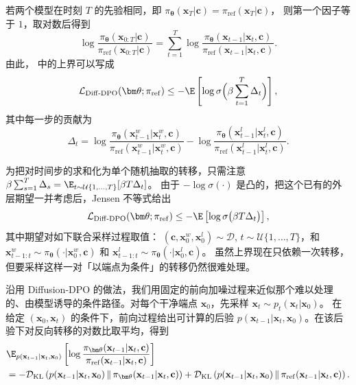 若两个模型在时刻 $T$ 的先验相同，即
$\pi_{\bm\theta}(\mathbf x_T| \mathbf c)=\pi_{\mathrm{ref}}(\mathbf x_T| \mathbf c)$，
则第一个因子等于 $1$，取对数后得到
\[
\log\frac{\pi_{\bm\theta}(\mathbf x_{0:T}| \mathbf c)}{\pi_{\mathrm{ref}}(\mathbf x_{0:T}| \mathbf c)}
=\sum_{t=1}^{T}
\log\frac{\pi_{\bm\theta}(\mathbf x_{t-1}| \mathbf x_t,\mathbf c)}
         {\pi_{\mathrm{ref}}(\mathbf x_{t-1}| \mathbf x_t,\mathbf c)}.
\]
由此， 中的上界可以写成
\[
\mathcal L_{\mathrm{Diff\text{-}DPO}}(\bm\theta;\pi_{\mathrm{ref}})
  \le  - \E \left[\log\sigma \Big(\beta \sum_{t=1}^T \Delta_t\Big)\right],
\]
其中每一步的贡献为
\[
\Delta_t
= \log\frac{\pi_{\bm\theta}(\mathbf x^w_{t-1}|\mathbf x^w_t,\mathbf c)}
               {\pi_{\mathrm{ref}}(\mathbf x^w_{t-1}|\mathbf x^w_t,\mathbf c)}
- \log\frac{\pi_{\bm\theta}(\mathbf x^l_{t-1}|\mathbf x^l_t,\mathbf c)}
               {\pi_{\mathrm{ref}}(\mathbf x^l_{t-1}|\mathbf x^l_t,\mathbf c)}.
\]

为把对时间步的求和化为单个随机抽取的转移，只需注意
$\beta\sum_{s=1}^T\Delta_s
\allowbreak=\allowbreak
\E_{t\sim\mathcal U\{1,\dots,T\}}[\beta T\Delta_t]$。
由于 $-\log\sigma(\cdot)$ 是凸的，把这个已有的外层期望一并考虑后，Jensen 不等式给出
\[
\mathcal L_{\mathrm{Diff\text{-}DPO}}(\bm\theta;\pi_{\mathrm{ref}})
\leq
-\E\left[
\log\sigma\bigl(\beta T\Delta_t\bigr)
\right],
\]
其中期望对如下联合采样过程取值：
$(\mathbf c,\mathbf x_0^w,\mathbf x_0^l)\sim\mathcal D$,
$t\sim\mathcal U\{1,\dots,T\}$，和
$\mathbf x_{t-1:t}^w\sim
\pi_{\bm\theta}(\cdot|\mathbf x_0^w,\mathbf c)$ 和
$\mathbf x_{t-1:t}^l\sim
\pi_{\bm\theta}(\cdot|\mathbf x_0^l,\mathbf c)$。
虽然上界现在只依赖一次转移，但要采样这样一对「以端点为条件」的转移仍然很难处理。

沿用 Diffusion-DPO 的做法，我们用固定的前向加噪过程来近似那个难以处理的、由模型诱导的条件路径。对每个干净端点 $\mathbf x_0$，先采样 $\mathbf x_t
\sim
p_t(\mathbf x_t|\mathbf x_0)$。
在给定 $(\mathbf x_0,\mathbf x_t)$ 的条件下，前向过程给出可计算的后验 $p(\mathbf x_{t-1}|\mathbf x_t,\mathbf x_0)$。在该后验下对反向转移的对数比取平均，得到
\begin{align*}
&\E_{p(\mathbf x_{t-1}|\mathbf x_t,\mathbf x_0)}
\left[
\log
\frac{
\pi_{\bm\theta}(\mathbf x_{t-1}|\mathbf x_t,\mathbf c)
}{
\pi_{\mathrm{ref}}(\mathbf x_{t-1}|\mathbf x_t,\mathbf c)
}
\right]
\nonumber\\&=
-
\mathcal D_{\mathrm{KL}}
\left(
p(\mathbf x_{t-1}|\mathbf x_t,\mathbf x_0)
\,\middle\|\,
\pi_{\bm\theta}(\mathbf x_{t-1}|\mathbf x_t,\mathbf c)
\right)+
\mathcal D_{\mathrm{KL}}
\left(
p(\mathbf x_{t-1}|\mathbf x_t,\mathbf x_0)
\,\middle\|\,
\pi_{\mathrm{ref}}(\mathbf x_{t-1}|\mathbf x_t,\mathbf c)
\right).
\end{align*}

